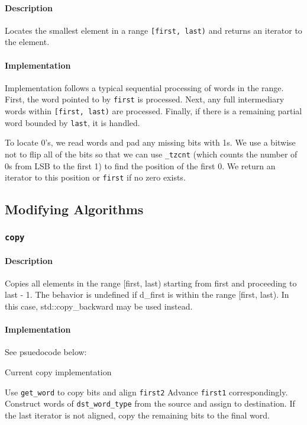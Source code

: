\documentclass[letterpaper, 8pt, twocolumn]{article}
\begin{document}
\paragraph{Description}
Locates the smallest element in a range \texttt{[first, last)} and returns an iterator to the element.

\paragraph{Implementation}
Implementation follows a typical sequential processing of words in the range. First, the word pointed to by \texttt{first} is processed. Next, any full intermediary words within \texttt{[first, last)} are processed. Finally, if there is a remaining partial word bounded by \texttt{last}, it is handled.

To locate 0's, we read words and pad any missing bits with 1s. We use a bitwise not to flip all of the bits so that we can use \texttt{\_tzcnt} (which counts the number of 0s from LSB to the first 1) to find the position of the first 0. We return an iterator to this position or \texttt{first} if no zero exists.


\subsection{Modifying Algorithms}
\label{subsec:modifyingAlgs}

\subsubsection{\texttt{copy}}
\label{subsubsec:copy}
\paragraph{Description}
Copies all elements in the range [first, last) starting from first and 
proceeding to last - 1. The behavior is undefined if d\_first is within the 
range [first, last). In this case, std::copy\_backward may be used instead.

\paragraph{Implementation}
See psuedocode below:
\begin{algorithm}[H]
    \caption{Current copy implementation}
    \begin{algorithmic}[1]
            \State Use \texttt{get\_word} to copy bits and align \texttt{first2}
            \State Advance \texttt{first1} correspondingly.
        \EndIf
            \State Construct words of \texttt{dst\_word\_type}
            from the source and assign to destination.
        \EndWhile
        \State If the last iterator is not aligned, copy the remaining bits to the
            final word.
        \EndFunction
    \end{algorithmic}
\end{algorithm}
\end{document}
